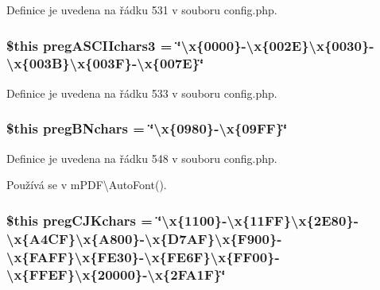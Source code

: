 Definice je uvedena na řádku 531 v souboru config.\-php.

\hypertarget{config_8php_a182d60f561cc17ad99c502f8dba365b1}{
\subsubsection[{preg\-A\-S\-C\-I\-Ichars3}]{\setlength{\rightskip}{0pt plus 5cm}\$this preg\-A\-S\-C\-I\-Ichars3 = \char`\"{}\textbackslash{}x\{0000\}-\/\textbackslash{}x\{002\-E\}\textbackslash{}x\{0030\}-\/\textbackslash{}x\{003\-B\}\textbackslash{}x\{003\-F\}-\/\textbackslash{}x\{007\-E\}\char`\"{}}}\label{config_8php_a182d60f561cc17ad99c502f8dba365b1}


Definice je uvedena na řádku 533 v souboru config.\-php.

\hypertarget{config_8php_a5276bdce17f86fd954eb512508901903}{
\subsubsection[{preg\-B\-Nchars}]{\setlength{\rightskip}{0pt plus 5cm}\$this preg\-B\-Nchars = \char`\"{}\textbackslash{}x\{0980\}-\/\textbackslash{}x\{09\-F\-F\}\char`\"{}}}\label{config_8php_a5276bdce17f86fd954eb512508901903}


Definice je uvedena na řádku 548 v souboru config.\-php.



Používá se v m\-P\-D\-F\textbackslash{}\-Auto\-Font().

\hypertarget{config_8php_ae8b3e9366007d6d3fb765a74188a8a9f}{
\subsubsection[{preg\-C\-J\-Kchars}]{\setlength{\rightskip}{0pt plus 5cm}\$this preg\-C\-J\-Kchars = \char`\"{}\textbackslash{}x\{1100\}-\/\textbackslash{}x\{11\-F\-F\}\textbackslash{}x\{2\-E80\}-\/\textbackslash{}x\{\-A4\-C\-F\}\textbackslash{}x\{\-A800\}-\/\textbackslash{}x\{\-D7\-A\-F\}\textbackslash{}x\{\-F900\}-\/\textbackslash{}x\{\-F\-A\-F\-F\}\textbackslash{}x\{\-F\-E30\}-\/\textbackslash{}x\{\-F\-E6\-F\}\textbackslash{}x\{\-F\-F00\}-\/\textbackslash{}x\{\-F\-F\-E\-F\}\textbackslash{}x\{20000\}-\/\textbackslash{}x\{2\-F\-A1\-F\}\char`\"{}}}\label{config_8php_ae8b3e9366007d6d3fb765a74188a8a9f}


